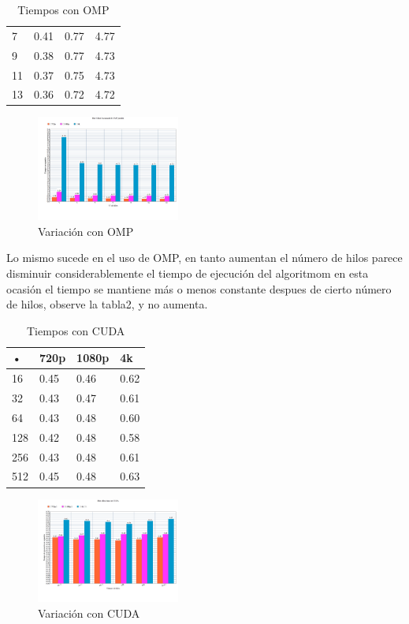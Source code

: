 \documentclass{IEEEtran}
\begin{document}
\begin{enumerate}
\begin{table}[H]
\begin{tabular}{|p{1.5cm}||p{1.5cm}|p{1.5cm}|p{1.5cm}| }
7&	0.41&	0.77&	4.77\\
9&	0.38&	0.77&	4.73\\
11&	0.37&	0.75&	4.73\\
13&	0.36&	0.72&	4.72\\
\hline		
\end{tabular} 
\caption{Tiempos con OMP} \label{table:table2}
\end{table}
\begin{figure}[H]
\centering
\includegraphics[width=0.42\textwidth]{graph2}
\caption{Variación con OMP} \label{fig:fig3}
\end{figure}
\end{enumerate}

Lo mismo sucede en el uso de OMP, en tanto aumentan el número de hilos parece disminuir considerablemente el tiempo de ejecución del algoritmom en esta ocasión el tiempo se mantiene más o menos constante despues de cierto número de hilos, observe la tabla2, y no aumenta.


\begin{table}[H]
\centering
\begin{tabular}{|p{1.5cm}||p{1.5cm}|p{1.5cm}|p{1.5cm}| }
\hline 
•&	720p&	1080p&	4k \\
\hline 
\hline 
16 	&	0.45	&	0.46	& 	0.62	\\
32 	&	0.43	&	0.47	&	0.61	\\
64 	&	0.43	&	0.48	& 	0.60	\\
128 &	0.42	&	0.48	&	0.58	\\
256 &	0.43	&	0.48	&	0.61	\\
512	&	0.45	&	0.48	&	0.63	\\
\hline		
\end{tabular} 
\caption{Tiempos con CUDA} \label{table:table3}
\end{table}
\begin{figure}[H]
\centering
\includegraphics[width=0.42\textwidth]{graph3}
\caption{Variación con CUDA} \label{fig:fig4}
\end{figure}
\end{document}
